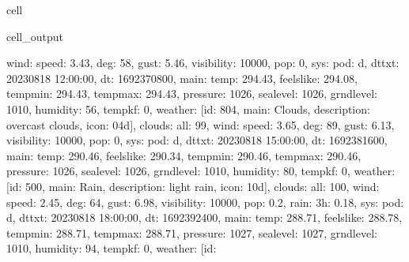 \documentclass[letterpaper,10pt,english]{jupyterBook}
\begin{document}
\begin{sphinxuseclass}{cell}
\begin{sphinxVerbatimOutput}
\begin{sphinxuseclass}{cell_output}
\begin{sphinxVerbatim}[commandchars=\\\{\}]
\PYGZsq{}wind\PYGZsq{}: \PYGZob{}\PYGZsq{}speed\PYGZsq{}: 3.43, \PYGZsq{}deg\PYGZsq{}: 58, \PYGZsq{}gust\PYGZsq{}: 5.46\PYGZcb{}, \PYGZsq{}visibility\PYGZsq{}: 10000, \PYGZsq{}pop\PYGZsq{}: 0, \PYGZsq{}sys\PYGZsq{}: \PYGZob{}\PYGZsq{}pod\PYGZsq{}: \PYGZsq{}d\PYGZsq{}\PYGZcb{}, \PYGZsq{}dt\PYGZus{}txt\PYGZsq{}: \PYGZsq{}2023\PYGZhy{}08\PYGZhy{}18 12:00:00\PYGZsq{}\PYGZcb{}, \PYGZob{}\PYGZsq{}dt\PYGZsq{}: 1692370800, \PYGZsq{}main\PYGZsq{}: \PYGZob{}\PYGZsq{}temp\PYGZsq{}: 294.43, \PYGZsq{}feels\PYGZus{}like\PYGZsq{}: 294.08, \PYGZsq{}temp\PYGZus{}min\PYGZsq{}: 294.43, \PYGZsq{}temp\PYGZus{}max\PYGZsq{}: 294.43, \PYGZsq{}pressure\PYGZsq{}: 1026, \PYGZsq{}sea\PYGZus{}level\PYGZsq{}: 1026, \PYGZsq{}grnd\PYGZus{}level\PYGZsq{}: 1010, \PYGZsq{}humidity\PYGZsq{}: 56, \PYGZsq{}temp\PYGZus{}kf\PYGZsq{}: 0\PYGZcb{}, \PYGZsq{}weather\PYGZsq{}: [\PYGZob{}\PYGZsq{}id\PYGZsq{}: 804, \PYGZsq{}main\PYGZsq{}: \PYGZsq{}Clouds\PYGZsq{}, \PYGZsq{}description\PYGZsq{}: \PYGZsq{}overcast clouds\PYGZsq{}, \PYGZsq{}icon\PYGZsq{}: \PYGZsq{}04d\PYGZsq{}\PYGZcb{}], \PYGZsq{}clouds\PYGZsq{}: \PYGZob{}\PYGZsq{}all\PYGZsq{}: 99\PYGZcb{}, \PYGZsq{}wind\PYGZsq{}: \PYGZob{}\PYGZsq{}speed\PYGZsq{}: 3.65, \PYGZsq{}deg\PYGZsq{}: 89, \PYGZsq{}gust\PYGZsq{}: 6.13\PYGZcb{}, \PYGZsq{}visibility\PYGZsq{}: 10000, \PYGZsq{}pop\PYGZsq{}: 0, \PYGZsq{}sys\PYGZsq{}: \PYGZob{}\PYGZsq{}pod\PYGZsq{}: \PYGZsq{}d\PYGZsq{}\PYGZcb{}, \PYGZsq{}dt\PYGZus{}txt\PYGZsq{}: \PYGZsq{}2023\PYGZhy{}08\PYGZhy{}18 15:00:00\PYGZsq{}\PYGZcb{}, \PYGZob{}\PYGZsq{}dt\PYGZsq{}: 1692381600, \PYGZsq{}main\PYGZsq{}: \PYGZob{}\PYGZsq{}temp\PYGZsq{}: 290.46, \PYGZsq{}feels\PYGZus{}like\PYGZsq{}: 290.34, \PYGZsq{}temp\PYGZus{}min\PYGZsq{}: 290.46, \PYGZsq{}temp\PYGZus{}max\PYGZsq{}: 290.46, \PYGZsq{}pressure\PYGZsq{}: 1026, \PYGZsq{}sea\PYGZus{}level\PYGZsq{}: 1026, \PYGZsq{}grnd\PYGZus{}level\PYGZsq{}: 1010, \PYGZsq{}humidity\PYGZsq{}: 80, \PYGZsq{}temp\PYGZus{}kf\PYGZsq{}: 0\PYGZcb{}, \PYGZsq{}weather\PYGZsq{}: [\PYGZob{}\PYGZsq{}id\PYGZsq{}: 500, \PYGZsq{}main\PYGZsq{}: \PYGZsq{}Rain\PYGZsq{}, \PYGZsq{}description\PYGZsq{}: \PYGZsq{}light rain\PYGZsq{}, \PYGZsq{}icon\PYGZsq{}: \PYGZsq{}10d\PYGZsq{}\PYGZcb{}], \PYGZsq{}clouds\PYGZsq{}: \PYGZob{}\PYGZsq{}all\PYGZsq{}: 100\PYGZcb{}, \PYGZsq{}wind\PYGZsq{}: \PYGZob{}\PYGZsq{}speed\PYGZsq{}: 2.45, \PYGZsq{}deg\PYGZsq{}: 64, \PYGZsq{}gust\PYGZsq{}: 6.98\PYGZcb{}, \PYGZsq{}visibility\PYGZsq{}: 10000, \PYGZsq{}pop\PYGZsq{}: 0.2, \PYGZsq{}rain\PYGZsq{}: \PYGZob{}\PYGZsq{}3h\PYGZsq{}: 0.18\PYGZcb{}, \PYGZsq{}sys\PYGZsq{}: \PYGZob{}\PYGZsq{}pod\PYGZsq{}: \PYGZsq{}d\PYGZsq{}\PYGZcb{}, \PYGZsq{}dt\PYGZus{}txt\PYGZsq{}: \PYGZsq{}2023\PYGZhy{}08\PYGZhy{}18 18:00:00\PYGZsq{}\PYGZcb{}, \PYGZob{}\PYGZsq{}dt\PYGZsq{}: 1692392400, \PYGZsq{}main\PYGZsq{}: \PYGZob{}\PYGZsq{}temp\PYGZsq{}: 288.71, \PYGZsq{}feels\PYGZus{}like\PYGZsq{}: 288.78, \PYGZsq{}temp\PYGZus{}min\PYGZsq{}: 288.71, \PYGZsq{}temp\PYGZus{}max\PYGZsq{}: 288.71, \PYGZsq{}pressure\PYGZsq{}: 1027, \PYGZsq{}sea\PYGZus{}level\PYGZsq{}: 1027, \PYGZsq{}grnd\PYGZus{}level\PYGZsq{}: 1010, \PYGZsq{}humidity\PYGZsq{}: 94, \PYGZsq{}temp\PYGZus{}kf\PYGZsq{}: 0\PYGZcb{}, \PYGZsq{}weather\PYGZsq{}: [\PYGZob{}\PYGZsq{}id\PYGZsq{}: 
\end{sphinxVerbatim}
\end{sphinxuseclass}
\end{sphinxVerbatimOutput}
\end{sphinxuseclass}
\end{document}
